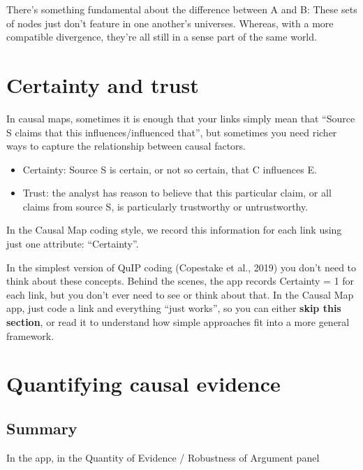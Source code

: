 \documentclass[
]{book}
\begin{document}
There's something fundamental about the difference between A and B: These sets of nodes just don't feature in one another's universes. Whereas, with a more compatible divergence, they're all still in a sense part of the same world.

\hypertarget{certainty-and-trust}{%
\chapter{Certainty and trust}\label{certainty-and-trust}}

In causal maps, sometimes it is enough that your links simply mean that ``Source S claims that this influences/influenced that'', but sometimes you need richer ways to capture the relationship between causal factors.

\begin{itemize}
\item
  Certainty: Source S is certain, or not so certain, that C influences E.
\item
  Trust: the analyst has reason to believe that this particular claim, or all claims from source S, is particularly trustworthy or untrustworthy.
\end{itemize}

In the Causal Map coding style, we record this information for each link using just one attribute: ``Certainty''.

In the simplest version of QuIP coding (Copestake et al., 2019) you don't need to think about these concepts. Behind the scenes, the app records Certainty = 1 for each link, but you don't ever need to see or think about that. In the Causal Map app, just code a link and everything ``just works'', so you can either \textbf{skip this section}, or read it to understand how simple approaches fit into a more general framework.

\hypertarget{quantifying-causal-evidence}{%
\chapter{Quantifying causal evidence}\label{quantifying-causal-evidence}}

\hypertarget{summary-2}{%
\section{Summary}\label{summary-2}}

In the app, in the Quantity of Evidence / Robustness of Argument panel
\end{document}
